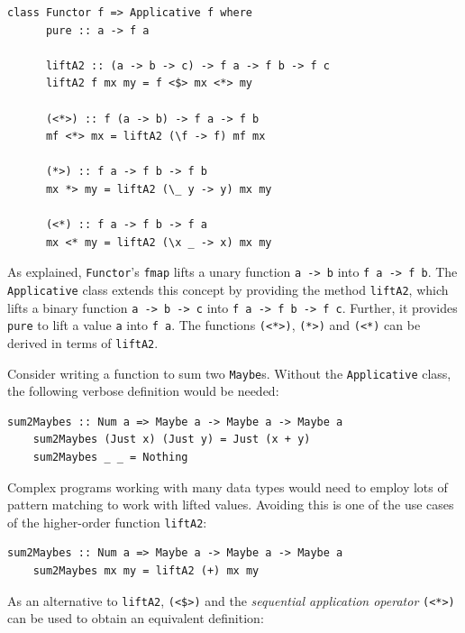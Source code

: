 \documentclass[UdineBachThesis,american,11pt]{PhdThesis}
\begin{document}
  \begin{Verbatim}[gobble=4,fontsize=\small]
    class Functor f => Applicative f where
      pure :: a -> f a

      liftA2 :: (a -> b -> c) -> f a -> f b -> f c
      liftA2 f mx my = f <$> mx <*> my

      (<*>) :: f (a -> b) -> f a -> f b
      mf <*> mx = liftA2 (\f -> f) mf mx

      (*>) :: f a -> f b -> f b
      mx *> my = liftA2 (\_ y -> y) mx my

      (<*) :: f a -> f b -> f a
      mx <* my = liftA2 (\x _ -> x) mx my
  \end{Verbatim}

  As explained, \mbox{\texttt{Functor}}'s \mbox{\texttt{fmap}} lifts a unary
  function \mbox{\texttt{a -> b}} into \mbox{\texttt{f a -> f b}}. The
  \mbox{\texttt{Applicative}} class extends this concept by providing the method
  \mbox{\texttt{liftA2}}, which lifts a binary function
  \mbox{\texttt{a -> b -> c}} into \mbox{\texttt{f a -> f b -> f c}}. Further,
  it provides \mbox{\texttt{pure}} to lift a value \texttt{a} into
  \mbox{\texttt{f a}}. The functions \mbox{\texttt{(<*>)}}, \mbox{\texttt{(*>)}}
  and \mbox{\texttt{(<*)}} can be derived in terms of \mbox{\texttt{liftA2}}.

  Consider writing a function to sum two \mbox{\texttt{Maybe}s}. Without the
  \mbox{\texttt{Applicative}} class, the following verbose definition would be
  needed:

  \begin{Verbatim}[gobble=4,fontsize=\small]
    sum2Maybes :: Num a => Maybe a -> Maybe a -> Maybe a
    sum2Maybes (Just x) (Just y) = Just (x + y)
    sum2Maybes _ _ = Nothing
  \end{Verbatim}

  Complex programs working with many data types would need to employ lots of
  pattern matching to work with lifted values. Avoiding this is one of the use
  cases of the higher-order function \mbox{\texttt{liftA2}}:

  \begin{Verbatim}[gobble=4,fontsize=\small]
    sum2Maybes :: Num a => Maybe a -> Maybe a -> Maybe a
    sum2Maybes mx my = liftA2 (+) mx my
  \end{Verbatim}

  As an alternative to \mbox{\texttt{liftA2}}, \mbox{\texttt{(<\$>)}} and the
  \emph{sequential application operator} \mbox{\texttt{(<*>)}} can be used to
  obtain an equivalent definition:
\end{document}
